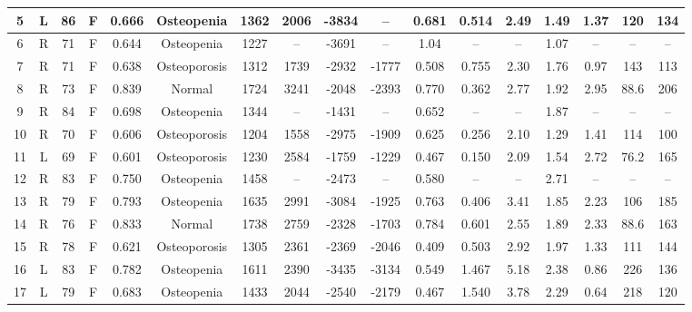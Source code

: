 {\begin{landscape}
\begin{table}
{\begin{tabular}{|c|c|c|c|c|c|c|c|c|c|c|c|c|c|c|c|c|}
\hline 5 & L & 86 & F & 0.666 & Osteopenia 		&  1362 &  2006 &  -3834 & --     & 0.681   & 0.514 &  2.49 &  1.49 &  1.37  & 120  & 134	\\ 

\hline 6 & R & 71 & F & 0.644 & Osteopenia		& 1227	& --	& -3691  & --	  & 1.04	& --	& --	& 1.07	& --  & -- &	--		\\ 

\hline 7  & R  & 71 & F & 0.638 & Osteoporosis 	&  1312 &  1739 &  -2932 &  -1777 & 0.508   & 0.755 &  2.30 &  1.76 &  0.97  & 143 & 113	\\ 

\hline 8  & R  & 73 & F & 0.839 & Normal		&  1724 &  3241 &  -2048 &  -2393 & 0.770 & 0.362 &  2.77 &  1.92 &  2.95  & 88.6 & 206 \\ 

\hline 9  & R  & 84 & F & 0.698 & Osteopenia	& 1344	& --	& -1431	& --	& 0.652	& --	& --	& 1.87	& -- & -- &	-- \\

\hline 10 & R & 70 & F & 0.606 & Osteoporosis &  1204 &  1558 &  -2975 &  -1909 & 0.625 & 0.256 &  2.10 &  1.29 &  1.41  & 114 & 100 \\ 

\hline 11 & L & 69 & F & 0.601 & Osteoporosis &  1230 &  2584 &  -1759 &  -1229 & 0.467 & 0.150 &  2.09 &  1.54 &  2.72  & 76.2 & 165 \\

\hline 12 & R & 83 & F & 0.750 & Osteopenia		& 1458	& --	& -2473	& --	& 0.580	& --	& --	& 2.71	& -- & -- &	-- \\

\hline 13 & R & 79 & F & 0.793 & Osteopenia &  1635 &  2991 &  -3084 &  -1925 & 0.763 & 0.406 &  3.41 &  1.85 &  2.23  & 106 & 185 \\

\hline 14 & R & 76 & F & 0.833 & Normal &  1738 &  2759 &  -2328 &  -1703 & 0.784 & 0.601 &  2.55 &  1.89 &  2.33  & 88.6 & 163 \\

\hline 15 & R & 78 & F & 0.621 & Osteoporosis &  1305 &  2361 &  -2369 &  -2046 & 0.409 & 0.503 &  2.92 &  1.97 &  1.33  & 111 & 144 \\

\hline 16 & L& 83 & F & 0.782 & Osteopenia &  1611 &  2390 &  -3435 &  -3134 & 0.549 & 1.467 &  5.18 &  2.38 &  0.86  & 226 & 136 \\

\hline 17 & L & 79 & F & 0.683 & Osteopenia &  1433 &  2044 &  -2540 &  -2179 & 0.467 & 1.540 &  3.78 &  2.29 &  0.64  & 218 & 120 \\


\end{tabular}}
\end{table}
\end{landscape}}
